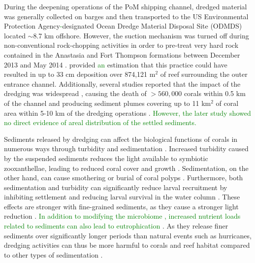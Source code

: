 \documentclass[preprint,12pt,authoryear]{elsarticle}
\newcommand{\modif}[1]{\textcolor{green}{#1}}
\begin{document}
During the deepening operations of the PoM shipping channel, dredged material was generally collected on barges and then transported to the US Environmental Protection Agency\modif{-}designated Ocean Dredge Material Disposal Site (ODMDS) located $\sim$8.7 km offshore. However, the suction mechanism was turned off during non-conventional rock-chopping activities in order to pre-treat very hard rock contained in the Anastasia and Fort Thompson formations between December 2013 and May 2014 \citep{miller2016detecting}. \cite{usace2017} provided \modif{an} estimation that this practice could have resulted in up to 33 cm deposition over 874,121 m$^2$ of reef surrounding the outer entrance channel. Additionally, several studies reported that the impact of the dredging was widespread \citep{miller2016detecting}, causing the death of  $> 560,000$ corals within 0.5 km of the channel \citep{cunning2019extensive} and producing sediment plumes covering up to 11 km$^2$ of coral area within 5-10 km of the dredging operations \citep{barnes2015sediment}. \modif{However, the later study showed no direct evidence of areal distribution of the settled sediments.} 

Sediments released by dredging can affect the biological functions of corals in numerous ways  through turbidity and sedimentation \citep{erftemeijer2012environmental,jones2015effects}. Increased turbidity caused by the suspended sediments reduces the light available to symbiotic zooxanthellae, leading to reduced coral cover and growth \citep{kendall1983effects,rogers1990responses,anthony1999tank,hennige2008photoacclimation}. Sedimentation, on the other hand, can cause smothering or burial of coral polyps \citep{erftemeijer2012environmental,jones2015effects,jones2019sediment}. Furthermore, both sedimentation and turbidity can significantly reduce larval recruitment by inhibiting settlement and reducing larval survival in the water column \citep{jones2015effects}. These effects are stronger with fine-grained sediments, as they cause a stronger light reduction \citep{storlazzi2015influence,fourney2017additive}. \modif{In addition to modifying the microbiome \citep{rosales2019oceanographic}, increased nutrient loads related to sediments can also lead to eutrophication \citep{wittenberg1992effects}}.
As they release finer sediments over significantly longer periods than natural events such as hurricanes, dredging activities can thus be more harmful to corals and reef habitat compared to other types of sedimentation \citep{cunning2019extensive}.
\end{document}
